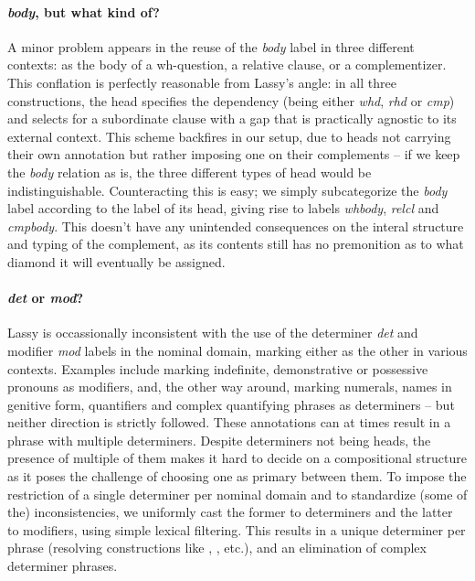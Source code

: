 \paragraph{\textit{body}, but what kind of?}
A minor problem appears in the reuse of the \textit{body} label in three different contexts: as the body of a wh-question, a relative clause, or a complementizer.
This conflation is perfectly reasonable from Lassy's angle: in all three constructions, the head specifies the dependency (being either \textit{whd}, \textit{rhd} or \textit{cmp}) and selects for a subordinate clause with a gap that is practically agnostic to its external context.
This scheme backfires in our setup, due to heads not carrying their own annotation but rather imposing one on their complements -- if we keep the \textit{body} relation as is, the three different types of head would be indistinguishable.
Counteracting this is easy; we simply subcategorize the \textit{body} label according to the label of its head, giving rise to labels \textit{whbody}, \textit{relcl} and \textit{cmpbody}.
This doesn't have any unintended consequences on the interal structure and typing of the complement, as its contents still has no premonition as to what diamond it will eventually be assigned.

\paragraph{\textit{det} or \textit{mod}?}
Lassy is occassionally inconsistent with the use of the determiner \textit{det} and modifier \textit{mod} labels in the nominal domain, marking either as the other in various contexts.
Examples include marking indefinite, demonstrative or possessive pronouns as modifiers, and, the other way around, marking numerals, names in genitive form, quantifiers and complex quantifying phrases as determiners -- but neither direction is strictly followed.
These annotations can at times result in a phrase with multiple determiners.
Despite determiners not being heads, the presence of multiple of them makes it hard to decide on a compositional structure as it poses the challenge of choosing one as primary between them.
To impose the restriction of a single determiner per nominal domain and to standardize (some of the) inconsistencies, we uniformly cast the former to determiners and the latter to modifiers, using simple lexical filtering.
This results in a unique determiner per phrase (resolving constructions like , , etc.), and an elimination of complex determiner phrases.

